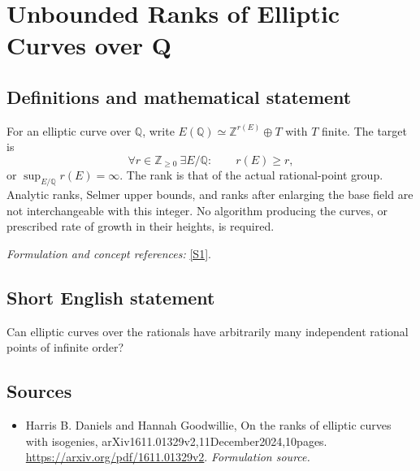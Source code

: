 \documentclass[11pt]{article}
\begin{document}
\section*{\texorpdfstring{Unbounded Ranks of Elliptic Curves over Q}{Unbounded Ranks of Elliptic Curves over Q}}\label{statement}
\subsection{Definitions and mathematical statement}
For an elliptic curve over ${\mathbb{Q}}$, write $E({\mathbb{Q}})\simeq{\mathbb{Z}}^{r(E)}\oplus T$ with $T$ finite. The target is
\[
 \forall r\in{\mathbb{Z}}_{\ge0}\ \exists E/{\mathbb{Q}}:\qquad r(E)\ge r,
\]
or $\sup_{E/{\mathbb{Q}}}r(E)=\infty$. The rank is that of the actual rational-point group. Analytic ranks, Selmer upper bounds, and ranks after enlarging the base field are not interchangeable with this integer. No algorithm producing the curves, or prescribed rate of growth in their heights, is required.
\par\smallskip\textit{Formulation and concept references:} \href{https://arxiv.org/pdf/1611.01329v2}{[S1]}.

\subsection{Short English statement}
Can elliptic curves over the rationals have arbitrarily many independent rational points of infinite order?
\subsection{Sources}
\begin{itemize}
\item[S1]Harris B. Daniels and Hannah Goodwillie, On the ranks of elliptic curves with isogenies, arXiv1611.01329v2,11December2024,10pages.
\url{https://arxiv.org/pdf/1611.01329v2}.
\textit{Formulation source.}
\end{itemize}
\end{document}
